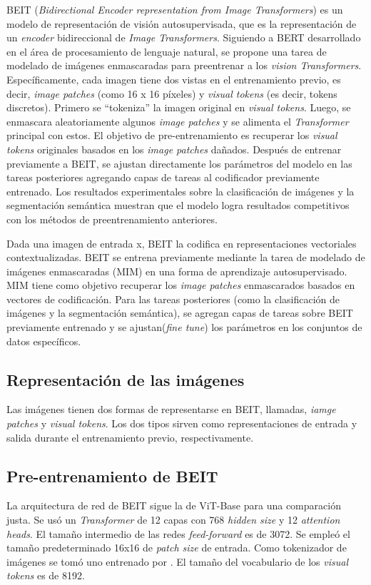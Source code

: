 BEIT (\textit{Bidirectional Encoder representation from Image Transformers}) \parencite{91} es un modelo de representación de visión autosupervisada, que es la representación de un \textit{encoder} bidireccional de \textit{Image Transformers}. Siguiendo a BERT \parencite{11} desarrollado en el área de procesamiento de lenguaje natural, se propone una tarea de modelado de imágenes enmascaradas para preentrenar a los \textit{vision Transformers}. Específicamente, cada imagen tiene dos vistas en el entrenamiento previo, es decir, \textit{image patches} (como 16 x 16 píxeles) y \textit{visual tokens} (es decir, tokens discretos). Primero se “tokeniza” la imagen original en \textit{visual tokens}. Luego, se enmascara aleatoriamente algunos \textit{image patches} y se alimenta el \textit{Transformer} principal con estos. El objetivo de pre-entrenamiento es recuperar los \textit{visual tokens} originales basados en los \textit{image patches} dañados. Después de entrenar previamente a BEIT, se ajustan directamente los parámetros del modelo en las tareas posteriores agregando capas de tareas al codificador previamente entrenado. Los resultados experimentales sobre la clasificación de imágenes y la segmentación semántica muestran que el modelo logra resultados competitivos con los métodos de preentrenamiento anteriores.

Dada una imagen de entrada x, BEIT la codifica en representaciones vectoriales contextualizadas. BEIT se entrena previamente mediante la tarea de modelado de imágenes enmascaradas (MIM) en una forma de aprendizaje autosupervisado. MIM tiene como objetivo recuperar los \textit{image patches} enmascarados basados en vectores de codificación. Para las tareas posteriores (como la clasificación de imágenes y la segmentación semántica), se agregan capas de tareas sobre BEIT previamente entrenado y se ajustan(\textit{fine tune}) los parámetros en los conjuntos de datos específicos.

\subsection{Representación de las imágenes}
Las imágenes tienen dos formas de representarse en BEIT, llamadas, \textit{iamge patches} y \textit{visual tokens}. Los dos tipos sirven como representaciones de entrada y salida durante el entrenamiento previo, respectivamente.

\subsection{Pre-entrenamiento de BEIT}
La arquitectura de red de BEIT sigue la de ViT-Base \parencite{92} para una comparación justa. Se usó un \textit{Transformer} de 12 capas con 768 \textit{hidden size} y 12 \textit{attention heads}. El tamaño intermedio de las redes \textit{feed-forward} es  de 3072. Se empleó el tamaño predeterminado 16x16 de \textit{patch size} de entrada. Como tokenizador de imágenes se tomó uno entrenado por \parencite{93}. El tamaño del vocabulario de los \textit{visual tokens} es de 8192. 

